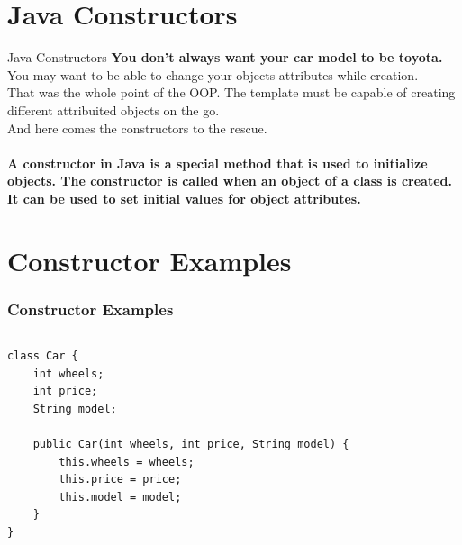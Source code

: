 \documentclass{beamer}
\begin{document}
\section{Java Constructors}

\begin{frame}{Java Constructors}
\textbf{You don't always want your car model to be toyota.}\\
You may want to be able to change your objects attributes while creation.\\That was the whole point of the OOP. The template must be capable of creating different attribuited objects on the go.\\And here comes the constructors to the rescue.\\~\\
\textbf{A constructor in Java is a special method that is used to initialize objects. The constructor is called when an object of a class is created. It can be used to set initial values for object attributes.}
\end{frame}


\section{Constructor Examples}

\begin{frame}[fragile]
\frametitle{Constructor Examples}
\begin{columns}[T]
\begin{column}{\textwidth}
\begin{lstlisting}
class Car {
    int wheels;
    int price;
    String model;

    public Car(int wheels, int price, String model) {
        this.wheels = wheels;
        this.price = price;
        this.model = model;
    }
}

\end{lstlisting}
\end{column}
\end{columns}
\end{frame}



\end{document}
